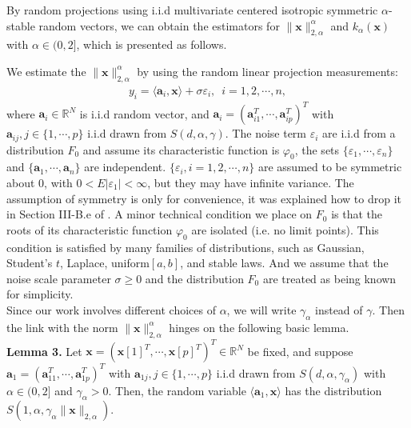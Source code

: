 \documentclass[journal,onecolumn]{IEEEtran}
\begin{document}
By random projections using i.i.d multivariate centered isotropic symmetric $\alpha$-stable random vectors, we can obtain the estimators for $\lVert\mathbf{x}\rVert_{2,\alpha}^{\alpha}$ and $k_{\alpha}(\mathbf{x})$ with $\alpha\in(0,2]$, which is presented as follows.

We estimate the $\lVert\mathbf{x}\rVert_{2,\alpha}^{\alpha}$ by using the random linear projection measurements: \begin{align}
y_i=\langle \mathbf{a}_i,\mathbf{x}\rangle+\sigma\varepsilon_i, \,\,\,i=1,2,\cdots,n,
\end{align}
where $\mathbf{a}_i\in\mathbb{R}^N$ is i.i.d random vector, and $\mathbf{a}_i=(\mathbf{a}_{i1}^T,\cdots,\mathbf{a}_{ip}^T)^T$ with $\mathbf{a}_{ij},j\in\{1,\cdots,p\}$ i.i.d drawn from $S(d,\alpha,\gamma)$. The noise term $\varepsilon_i$ are i.i.d from a distribution $F_0$ and assume its characteristic function is $\varphi_0$, the sets $\{\varepsilon_1,\cdots,\varepsilon_n\}$ and $\{\mathbf{a}_1,\cdots,\mathbf{a}_n\}$ are independent. $\{\varepsilon_i, i=1,2,\cdots,n\}$ are assumed to be symmetric about $0$, with $0<E|\varepsilon_1|<\infty$, but they may have infinite variance. The assumption of symmetry is only for convenience, it was explained how to drop it in Section III-B.e of \cite{l2}. A minor technical condition we place on $F_0$ is that the roots of its characteristic function $\varphi_0$ are isolated (i.e. no limit points). This
condition is satisfied by many families of distributions, such
as Gaussian, Student's $t$, Laplace, uniform$[a, b]$, and stable
laws. And we assume that the noise scale parameter $\sigma\geq0$ and the distribution $F_0$ are treated as being known for simplicity.\\

Since our work involves different choices of $\alpha$, we will write $\gamma_\alpha$ instead of $\gamma$. Then the link with the norm  $\lVert\mathbf{x}\rVert_{2,\alpha}^{\alpha}$ hinges on the following basic lemma.\\

\noindent
{\bf Lemma 3.} Let $\mathbf{x}=(\mathbf{x}[1]^T,\cdots,\mathbf{x}[p]^T)^T\in\mathbb{R}^N$ be fixed, and suppose $\mathbf{a}_1=(\mathbf{a}_{11}^T,\cdots,\mathbf{a}_{1p}^T)^T$ with $\mathbf{a}_{1j}, j\in\{1,\cdots,p\}$ i.i.d drawn from $S(d,\alpha,\gamma_\alpha)$ with $\alpha\in(0,2]$
and $\gamma_\alpha>0$. Then, the random variable $\langle \mathbf{a}_1,\mathbf{x}\rangle$ has the distribution $S(1,\alpha,\gamma_\alpha\lVert\mathbf{x}\rVert_{2,\alpha})$.\\
\end{document}
